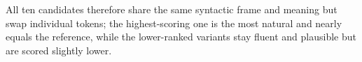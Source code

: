 \begin{parts}
\begin{subparts}
{        All ten candidates therefore share the same syntactic frame and meaning but swap individual tokens; the highest-scoring one is the most natural and nearly equals the reference, while the lower-ranked variants stay fluent and plausible but are scored slightly lower.
        }
        
    \end{subparts}
    
\end{parts}
